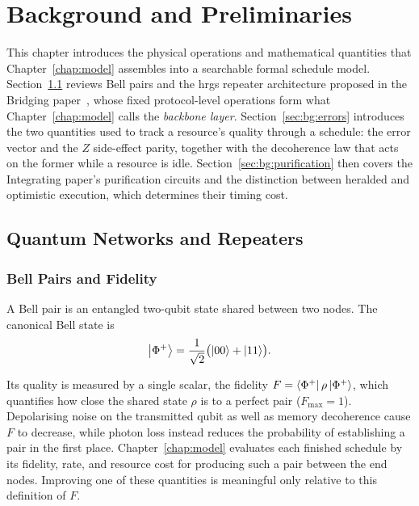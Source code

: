 \chapter{Background and Preliminaries}
\label{chap:background}

This chapter introduces the physical operations and mathematical quantities that Chapter~\ref{chap:model} assembles into a searchable formal schedule model. Section~\ref{sec:bg:networks} reviews Bell pairs and the \Gls{hrgs} repeater architecture proposed in the Bridging paper~\cite{Benchasattabuse2026Bridging}, whose fixed protocol-level operations form what Chapter~\ref{chap:model} calls the \emph{backbone layer}. Section~\ref{sec:bg:errors} introduces the two quantities used to track a resource's quality through a schedule: the error vector and the $Z$ side-effect parity, together with the decoherence law that acts on the former while a resource is idle. Section~\ref{sec:bg:purification} then covers the Integrating paper's purification circuits and the distinction between heralded and optimistic execution, which determines their timing cost.

\section{Quantum Networks and Repeaters}
\label{sec:bg:networks}

\subsection{Bell Pairs and Fidelity}
\label{sec:bg:bellpairs}

A Bell pair is an entangled two-qubit state shared between two nodes. The canonical Bell state is
\[
    \ket{\Phi^+} = \frac{1}{\sqrt{2}}\bigl(\ket{00} + \ket{11}\bigr).
\]

\noindent Its quality is measured by a single scalar, the fidelity $F = \bra{\Phi^+}\rho\ket{\Phi^+}$, which quantifies how close the shared state $\rho$ is to a perfect pair ($F_\text{max}=1$). Depolarising noise on the transmitted qubit as well as memory decoherence cause $F$ to decrease, while photon loss instead reduces the probability of establishing a pair in the first place. Chapter~\ref{chap:model} evaluates each finished schedule by its fidelity, rate, and resource cost for producing such a pair between the end nodes. Improving one of these quantities is meaningful only relative to this definition of $F$.


